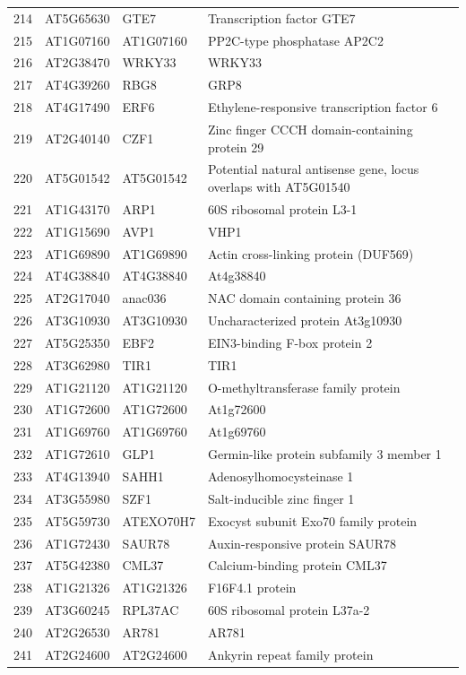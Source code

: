\documentclass[11pt]{article}
\begin{document}
\begin{center}
\begin{tabular}{rlll}
214 & AT5G65630 & GTE7 & Transcription factor GTE7\\
215 & AT1G07160 & AT1G07160 & PP2C-type phosphatase AP2C2\\
216 & AT2G38470 & WRKY33 & WRKY33\\
217 & AT4G39260 & RBG8 & GRP8\\
218 & AT4G17490 & ERF6 & Ethylene-responsive transcription factor 6\\
219 & AT2G40140 & CZF1 & Zinc finger CCCH domain-containing protein 29\\
220 & AT5G01542 & AT5G01542 & Potential natural antisense gene, locus overlaps with AT5G01540\\
221 & AT1G43170 & ARP1 & 60S ribosomal protein L3-1\\
222 & AT1G15690 & AVP1 & VHP1\\
223 & AT1G69890 & AT1G69890 & Actin cross-linking protein (DUF569)\\
224 & AT4G38840 & AT4G38840 & At4g38840\\
225 & AT2G17040 & anac036 & NAC domain containing protein 36\\
226 & AT3G10930 & AT3G10930 & Uncharacterized protein At3g10930\\
227 & AT5G25350 & EBF2 & EIN3-binding F-box protein 2\\
228 & AT3G62980 & TIR1 & TIR1\\
229 & AT1G21120 & AT1G21120 & O-methyltransferase family protein\\
230 & AT1G72600 & AT1G72600 & At1g72600\\
231 & AT1G69760 & AT1G69760 & At1g69760\\
232 & AT1G72610 & GLP1 & Germin-like protein subfamily 3 member 1\\
233 & AT4G13940 & SAHH1 & Adenosylhomocysteinase 1\\
234 & AT3G55980 & SZF1 & Salt-inducible zinc finger 1\\
235 & AT5G59730 & ATEXO70H7 & Exocyst subunit Exo70 family protein\\
236 & AT1G72430 & SAUR78 & Auxin-responsive protein SAUR78\\
237 & AT5G42380 & CML37 & Calcium-binding protein CML37\\
238 & AT1G21326 & AT1G21326 & F16F4.1 protein\\
239 & AT3G60245 & RPL37AC & 60S ribosomal protein L37a-2\\
240 & AT2G26530 & AR781 & AR781\\
241 & AT2G24600 & AT2G24600 & Ankyrin repeat family protein\\

\end{tabular}
\end{center}
\end{document}
